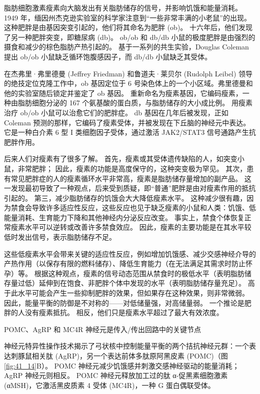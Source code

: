 脂肪细胞激素瘦素向大脑发出有关脂肪储存的信号，并影响饥饿和能量消耗。 1949 年，缅因州杰克逊实验室的科学家注意到“一些非常丰满的小老鼠”的出现。 这种肥胖是由基因突变引起的，他们将其命名为肥胖 (ob)。 十六年后，他们发现了另一种肥胖突变，即糖尿病 (db)。 ob/ob 和 db/db 小鼠的极度肥胖是由强烈的摄食和减少的棕色脂肪产热引起的。 基于一系列的共生实验，Douglas Coleman 提出 ob/ob 小鼠缺乏循环饱腹感因子，而 db/db 小鼠缺乏其受体。

在杰弗里·弗里德曼 (Jeffrey Friedman) 和鲁道夫·莱贝尔 (Rudolph Leibel) 领导的绝技定位克隆工作中，ob 基因定位于 6 号染色体上的一个小区域。弗里德曼和他的实验室随后锁定并鉴定了 ob 基因。 重新命名为瘦素基因，它编码瘦素，一种由脂肪细胞分泌的 167 个氨基酸的蛋白质，与脂肪储存的大小成比例。 用瘦素治疗 ob/ob 小鼠可以治愈它们的肥胖症。 db 基因在几年后被发现，正如 Coleman 预测的那样，它编码了瘦素受体，并被发现在下丘脑的神经元中表达。 它是一种白介素 6 型 I 类细胞因子受体，通过激活 JAK2/STAT3 信号通路产生抗肥胖作用。

后来人们对瘦素有了很多了解。 首先，瘦素或其受体遗传缺陷的人，如突变小鼠，非常肥胖； 因此，瘦素的功能是高度保守的，这种突变极为罕见。 其次，患有常见肥胖症的人的瘦素循环水平非常高，瘦素是脂肪储存量增加的副产品。 这一发现最初导致了一种观点，后来受到质疑，即“普通”肥胖是由对瘦素作用的抵抗引起的。 第三，减少脂肪储存的饥饿会大大降低瘦素水平。 这种减少很有趣，因为禁食会导致许多适应性反应，这些反应也见于缺乏瘦素的小鼠和人类：饥饿、低能量消耗、生育能力下降和其他神经内分泌反应改变。 事实上，禁食个体恢复正常瘦素水平可以逆转或改善许多禁食效应。 因此，瘦素的主要功能是在其水平较低时发出信号，表示脂肪储存不足。

这些低瘦素水平会带来关键的适应性反应，例如增加饥饿感、减少交感神经介导的产热作用（以保存有限的燃料储存）、降低生育能力（在无法满足其需求时防止怀孕）等。 根据这种观点，瘦素的信号动态范围从禁食时的极低水平（表明脂肪储存量过低）延伸到在饱食、非肥胖个体中发现的水平（表明脂肪储存量充足）。 高于此水平可能会产生一些抑制肥胖的效果，但如果存在这种效果，则非常微弱。 因此，能量平衡的防御是不对称的——对低储量强，对高储量弱。 一个推论是肥胖的人没有瘦素抵抗。 相反，他们只是瘦素水平超过了最大有效浓度。

POMC、AgRP 和 MC4R 神经元是传入/传出回路中的关键节点

神经元特异性操作技术揭示了弓状核中控制能量平衡的两个拮抗神经元群：一个表达刺豚鼠相关肽 (AgRP)，另一个表达前体多肽原阿黑皮素 (POMC)（图 \ref{fig:41_14}B）。 POMC 神经元减少饥饿感并刺激交感神经驱动的能量消耗； AgRP 神经元则相反。 POMC 神经元释放加工过的肽 α-促黑素细胞激素 (αMSH)，它激活黑皮质素 4 受体 (MC4R)，一种 G 蛋白偶联受体。

